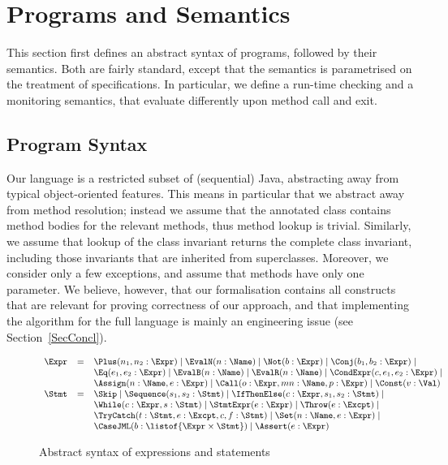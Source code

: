 \section{Programs and Semantics}\label{SecProgram}

This section first defines an abstract syntax of programs, followed by
their semantics. Both are fairly standard, except that the semantics
is parametrised on the treatment of specifications. In particular, we
define a run-time checking and a monitoring semantics, that evaluate
differently upon method call and exit.


\subsection{Program Syntax}\label{SecSyntax}
Our language is a restricted subset of (sequential) Java, abstracting
away from typical object-oriented features. This means in particular
that we abstract away from method resolution; instead we assume that
the annotated class contains method bodies for the relevant methods,
thus method lookup is trivial. Similarly, we assume that lookup of the
class invariant returns the complete class invariant, including those
invariants that are inherited from superclasses. Moreover, we consider
only a few exceptions, and assume that methods have only one
parameter. We believe, however, that our formalisation contains all
constructs that are relevant for proving correctness of our approach,
and that implementing the algorithm for the full language is mainly an
engineering issue (see Section~\ref{SecConcl}).

\begin{figure}[t]
\[{\small
\begin{array}{rcl}
\Expr & = & \Plus(n_1, n_2 : \Expr) \mid
            \EvalN(n : \Name) \mid
            \Not(b : \Expr) \mid
            \Conj(b_1, b_2 : \Expr) \mid \\
      &   & \Eq(e_1, e_2 : \Expr) \mid
            \EvalB(n : \Name) \mid
            \EvalR(n : \Name) \mid
            \CondExpr(c, e_1, e_2 : \Expr) \mid\\
      &   & \Assign(n : \Name, e : \Expr) \mid
            \Call(o : \Expr, mn : \Name, p : \Expr) \mid
            \Const(v : \Val) \\
\Stmt & = & \Skip \mid
            \Sequence(s_1, s_2 : \Stmt) \mid
            \IfThenElse(c : \Expr, s_1, s_2 : \Stmt) \mid\\
      &   & \While(c : \Expr, s : \Stmt) \mid
            \StmtExpr(e : \Expr) \mid
            \Throw(e : \Excpt) \mid\\
      &   & \TryCatch(t: \Stmt, e : \Excpt, c, f : \Stmt) \mid
            \Set(n : \Name, e : \Expr) \mid\\
      &   & \CaseJML(b : \listof{\Expr \times \Stmt}) \mid
            \Assert(e : \Expr)
\end{array}}
\]
\caption{Abstract syntax of expressions and statements}
\label{FigExprStmt}
\end{figure}

